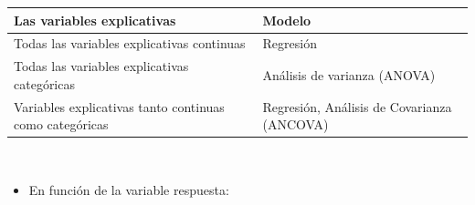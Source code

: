 \documentclass[]{book}
\providecommand{\tightlist}{%
  \setlength{\itemsep}{0pt}\setlength{\parskip}{0pt}}
\begin{document}
\begin{longtable}[]{@{}ll@{}}
\toprule
\begin{minipage}[b]{0.31\columnwidth}\raggedright\strut
\textbf{Las variables explicativas}\strut
\end{minipage} & \begin{minipage}[b]{0.63\columnwidth}\raggedright\strut
\textbf{Modelo}\strut
\end{minipage}\tabularnewline
\midrule
\endhead
\begin{minipage}[t]{0.31\columnwidth}\raggedright\strut
Todas las variables explicativas continuas\strut
\end{minipage} & \begin{minipage}[t]{0.63\columnwidth}\raggedright\strut
Regresión\strut
\end{minipage}\tabularnewline
\begin{minipage}[t]{0.31\columnwidth}\raggedright\strut
Todas las variables explicativas categóricas\strut
\end{minipage} & \begin{minipage}[t]{0.63\columnwidth}\raggedright\strut
Análisis de varianza (ANOVA)\strut
\end{minipage}\tabularnewline
\begin{minipage}[t]{0.31\columnwidth}\raggedright\strut
Variables explicativas tanto continuas como categóricas\strut
\end{minipage} & \begin{minipage}[t]{0.63\columnwidth}\raggedright\strut
Regresión, Análisis de Covarianza (ANCOVA)\strut
\end{minipage}\tabularnewline
\bottomrule
\end{longtable}

~

\begin{itemize}
\tightlist
\item
  En función de la variable respuesta:
\end{itemize}
\end{document}
